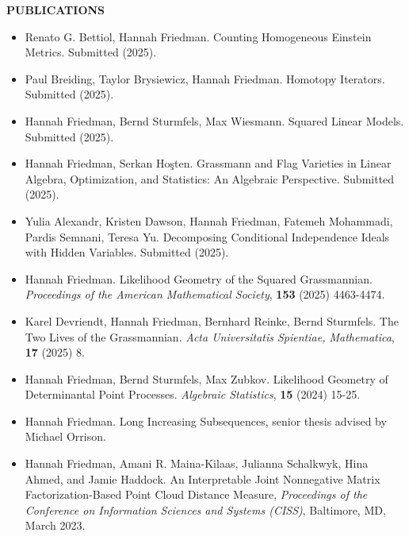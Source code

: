 \documentclass[11pt]{article}
\newcommand{\hdr}[1]{\textcolor{blue(ryb)}{\textbf{#1}}}
\begin{document}
\bigskip

\hdr{PUBLICATIONS}\\
\begin{itemize}
\item Renato G. Bettiol, Hannah Friedman.
  Counting Homogeneous Einstein Metrics.
  Submitted (2025).
\item Paul Breiding, Taylor Brysiewicz, Hannah Friedman.
  Homotopy Iterators.
  Submitted (2025). 
\item Hannah Friedman, Bernd Sturmfels, Max Wiesmann.
  Squared Linear Models.
  Submitted (2025). 
\item Hannah Friedman, Serkan Ho\c{s}ten.
  Grassmann and Flag Varieties in Linear Algebra, Optimization, and Statistics: An Algebraic Perspective.
  Submitted (2025).
\item Yulia Alexandr, Kristen Dawson, Hannah Friedman, Fatemeh Mohammadi, Pardis Semnani, Teresa Yu.
  Decomposing Conditional Independence Ideals with Hidden Variables. Submitted (2025).
\item Hannah Friedman.
  Likelihood Geometry of the Squared Grassmannian. \textit{Proceedings of the American Mathematical Society}, \textbf{153} (2025) 4463-4474.
  \item Karel Devriendt, Hannah Friedman, Bernhard Reinke, Bernd Sturmfels.
    The Two Lives of the Grassmannian.
    \textit{Acta Universitatis Spientiae, Mathematica}, \textbf{17} (2025) 8. 
\item Hannah Friedman, Bernd Sturmfels, Max Zubkov.
  Likelihood Geometry of Determinantal Point Processes.
  \emph{Algebraic Statistics}, \textbf{15} (2024) 15-25.
\item Hannah Friedman. Long Increasing Subsequences, senior thesis advised by Michael Orrison. 
\item Hannah Friedman, Amani R. Maina-Kilaas, Julianna Schalkwyk, Hina Ahmed, and Jamie Haddock. 
  An Interpretable Joint Nonnegative Matrix Factorization-Based Point Cloud Distance Measure, \emph{Proceedings of the Conference on Information Sciences and Systems (CISS)}, Baltimore, MD, March 2023.
\end{itemize}

\bigskip
\end{document}
